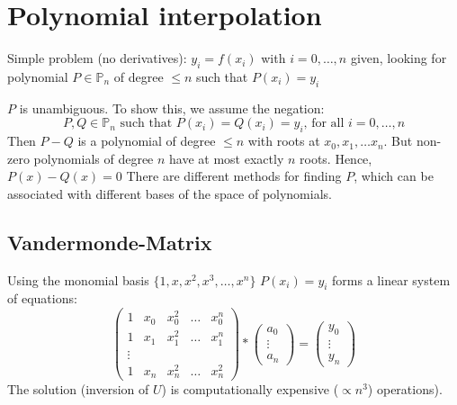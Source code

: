 \section{Polynomial interpolation}\label{sec:polynomial-interpolation}
Simple problem (no derivatives): $y_i = f(x_i)$ with $i = 0, \ldots, n$ given,
looking for polynomial $P \in \mathbb{P}_n$ of degree $\leq n$ such that
$P(x_i) = y_i$

$P$ is unambiguous.
To show this, we assume the negation:
\begin{equation*}
    P, Q \in \mathbb{P}_n \text{ such that } P(x_i)=Q(x_i)=y_i\text{, for all } i = 0, \ldots, n
\end{equation*}
Then $P-Q$ is a polynomial of degree $\leq n$ with roots at
$x_0, x_1, \ldots x_n$.
But non-zero polynomials of degree $n$ have at most
exactly $n$ roots.
Hence, $P(x)-Q(x) = 0$
There are different methods for finding $P$, which can be associated with different
bases of the space of polynomials.

\subsection{Vandermonde-Matrix}\label{subsec:vandermond-matrix}
Using the monomial basis $\{ 1, x, x^2, x^3, \ldots, x^n\}$ $P(x_i) = y_i$ forms a
linear system of equations:
\begin{equation*}
    \begin{pmatrix*}
        1 &x_0 &x_0^2 &\ldots & x_0^n\\
        1 &x_1 &x_1^2 &\ldots & x_1^n\\
        \vdots \\
        1 & x_n & x_n^2&\ldots  &x_n^2
    \end{pmatrix*}
    *
    \begin{pmatrix*}
        a_0 \\
        \vdots\\
        a_n
    \end{pmatrix*}
    =
    \begin{pmatrix*}
        y_0\\
        \vdots\\
        y_n
    \end{pmatrix*}
\end{equation*}
The solution (inversion of $U$) is computationally expensive ($\propto n^3$) operations).

